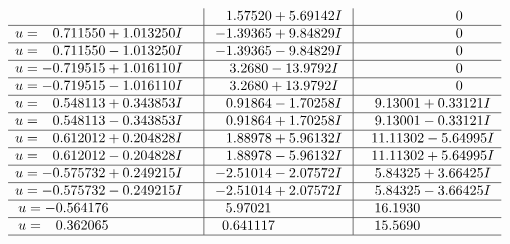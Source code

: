 \documentclass[1p]{elsarticle_modified}
\theoremstyle{definition}
\begin{document}
$$\begin{array}{c|c|c}
 & \phantom{-}1.57520 + 5.69142 I & \phantom{-0.000000 } 0 \\ \hline\begin{aligned}
u &= \phantom{-}0.711550 + 1.013250 I\end{aligned}
 & -1.39365 + 9.84829 I & \phantom{-0.000000 } 0 \\ \hline\begin{aligned}
u &= \phantom{-}0.711550 - 1.013250 I\end{aligned}
 & -1.39365 - 9.84829 I & \phantom{-0.000000 } 0 \\ \hline\begin{aligned}
u &= -0.719515 + 1.016110 I\end{aligned}
 & \phantom{-}3.2680 - 13.9792 I & \phantom{-0.000000 } 0 \\ \hline\begin{aligned}
u &= -0.719515 - 1.016110 I\end{aligned}
 & \phantom{-}3.2680 + 13.9792 I & \phantom{-0.000000 } 0 \\ \hline\begin{aligned}
u &= \phantom{-}0.548113 + 0.343853 I\end{aligned}
 & \phantom{-}0.91864 - 1.70258 I & \phantom{-}9.13001 + 0.33121 I \\ \hline\begin{aligned}
u &= \phantom{-}0.548113 - 0.343853 I\end{aligned}
 & \phantom{-}0.91864 + 1.70258 I & \phantom{-}9.13001 - 0.33121 I \\ \hline\begin{aligned}
u &= \phantom{-}0.612012 + 0.204828 I\end{aligned}
 & \phantom{-}1.88978 + 5.96132 I & \phantom{-}11.11302 - 5.64995 I \\ \hline\begin{aligned}
u &= \phantom{-}0.612012 - 0.204828 I\end{aligned}
 & \phantom{-}1.88978 - 5.96132 I & \phantom{-}11.11302 + 5.64995 I \\ \hline\begin{aligned}
u &= -0.575732 + 0.249215 I\end{aligned}
 & -2.51014 - 2.07572 I & \phantom{-}5.84325 + 3.66425 I \\ \hline\begin{aligned}
u &= -0.575732 - 0.249215 I\end{aligned}
 & -2.51014 + 2.07572 I & \phantom{-}5.84325 - 3.66425 I \\ \hline\begin{aligned}
u &= -0.564176\phantom{ +0.000000I}\end{aligned}
 & \phantom{-}5.97021\phantom{ +0.000000I} & \phantom{-}16.1930\phantom{ +0.000000I} \\ \hline\begin{aligned}
u &= \phantom{-}0.362065\phantom{ +0.000000I}\end{aligned}
 & \phantom{-}0.641117\phantom{ +0.000000I} & \phantom{-}15.5690\phantom{ +0.000000I}\\
 \hline 
 \end{array}$$\newpage
\end{document}
